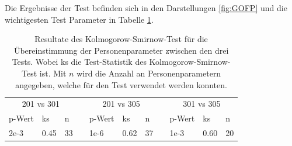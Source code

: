 Die Ergebnisse der Test befinden sich in den Darstellungen \ref{fig:GOFP} und die wichtigesten Test Parameter in Tabelle \ref{tab:GOFP}.
   \begin{table}[htbp]
     \centering
   \begin{tabular}{@{}lllllllllll@{}}
   \toprule
    \multicolumn{3}{c}{201 vs 301} &&  \multicolumn{3}{c}{201 vs 305}&&  \multicolumn{3}{c}{301 vs 305}\\ 
       \cmidrule{1-3}\cmidrule{5-7}\cmidrule{9-11}
    p-Wert & ks & n && p-Wert & ks & n && p-Wert & ks & n \\ 
   \midrule
     2e-3 & 0.45 & 33&& 1e-6 & 0.62 & 37 && 1e-3 & 0.60 & 20  \\ 
   
   \bottomrule
   \end{tabular} 
     \caption{Resultate des Kolmogorow-Smirnow-Test für die Übereinstimmung der Personenparameter zwischen den drei Tests. Wobei ks die Test-Statistik des Kolmogorow-Smirnow-Test ist. Mit $n$ wird die Anzahl an Personenparametern angegeben, welche für den Test verwendet werden konnten. }
     \label{tab:GOFP}
   \end{table}
   

